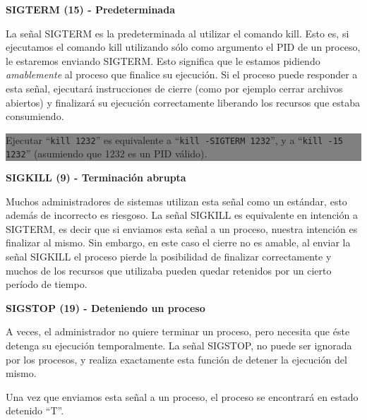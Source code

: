 \documentclass[12pt]{article}
\begin{document}
\textbf{SIGTERM (15) - Predeterminada}

La señal SIGTERM es la predeterminada al utilizar el comando kill. Esto 
es, si ejecutamos el comando kill utilizando sólo como argumento el PID 
de un proceso, le estaremos enviando SIGTERM. Esto significa que le estamos
pidiendo \textit{amablemente} al proceso que finalice su ejecución. 
Si el proceso puede responder a esta señal, ejecutará instrucciones de 
cierre (como por ejemplo cerrar archivos abiertos) y finalizará su 
ejecución correctamente liberando los recursos que estaba consumiendo. 

\colorbox{grey}{\parbox[t]{0.95\linewidth}{ \vspace*{0.5cm} { 
{\bf }
Ejecutar ``\texttt{kill 1232}'' es equivalente a ``\texttt{kill -SIGTERM 
1232}'', y a ``\texttt{kill -15 1232}'' (asumiendo que 1232 es un PID 
válido). 
} \vspace*{0.5cm} } } 

\textbf{SIGKILL (9) - Terminación abrupta}

Muchos administradores de sistemas utilizan esta señal como un estándar, 
esto además de incorrecto es riesgoso. La señal SIGKILL es equivalente en 
intención a SIGTERM, es decir que si enviamos esta señal a un proceso, 
nuestra intención es finalizar al mismo. Sin embargo, en este caso el
cierre no es amable, al enviar la señal SIGKILL el proceso pierde la 
posibilidad de finalizar correctamente y muchos de los recursos que 
utilizaba pueden quedar retenidos por un cierto período de tiempo.  




\textbf{SIGSTOP (19) - Deteniendo un proceso}

A veces, el administrador no quiere terminar un proceso, pero necesita
que éste detenga su ejecución temporalmente. La señal SIGSTOP, no puede
ser ignorada por los procesos, y realiza exactamente esta función de 
detener la ejecución del mismo. 

Una vez que enviamos esta señal a un proceso, el proceso se encontrará en 
estado detenido ``T''.
\end{document}
